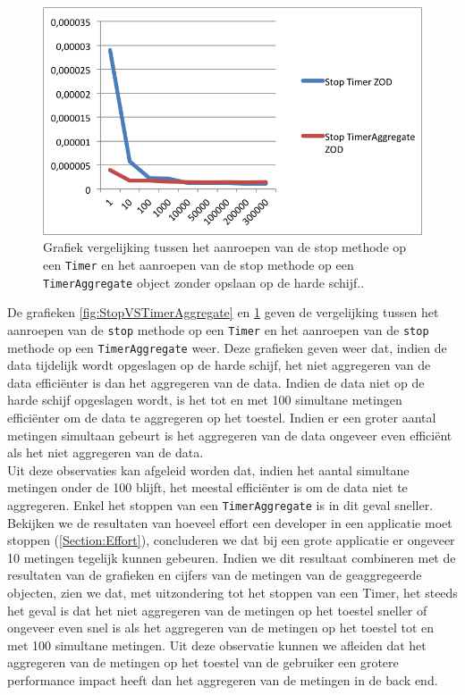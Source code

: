 \begin{figure}[h]
  \centering
  \includegraphics[scale=1.0]{Afbeeldingen/Evaluatie/StopVSTimerAggregateZOD}
  \caption{Grafiek vergelijking tussen het aanroepen van de stop methode op een \texttt{Timer} en het aanroepen van de stop methode op een \texttt{TimerAggregate} object zonder opslaan op de harde schijf..}
  \label{fig:StopVSTimerAggregateZOD}
\end{figure}
De grafieken \ref{fig:StopVSTimerAggregate} en \ref{fig:StopVSTimerAggregateZOD} geven de vergelijking tussen het aanroepen van de \texttt{stop} methode op een \texttt{Timer} en het aanroepen van de \texttt{stop} methode op een \texttt{TimerAggregate} weer. Deze grafieken geven weer dat, indien de data tijdelijk wordt opgeslagen op de harde schijf, het niet aggregeren van de data effici\"enter is dan het aggregeren van de data. Indien de data niet op de harde schijf opgeslagen wordt, is het tot en met 100 simultane metingen effici\"enter om de data te aggregeren op het toestel. Indien er een groter aantal metingen simultaan gebeurt is het aggregeren van de data ongeveer even effici\"ent als het niet aggregeren van de data. \\

Uit deze observaties kan afgeleid worden dat, indien het aantal simultane metingen onder de 100 blijft, het meestal effici\"enter is om de data niet te aggregeren. Enkel het stoppen van een \texttt{TimerAggregate} is in dit geval sneller. \\


Bekijken we de resultaten van hoeveel effort een developer in een applicatie moet stoppen (\ref{Section:Effort}), concluderen we dat bij een grote applicatie er ongeveer 10 metingen tegelijk kunnen gebeuren. Indien we dit resultaat combineren met de resultaten van de grafieken en cijfers van de metingen van de geaggregeerde objecten, zien we dat, met uitzondering tot het stoppen van een Timer, het steeds het geval is dat het niet aggregeren van de metingen op het toestel sneller of ongeveer even snel is als het aggregeren van de metingen op het toestel tot en met 100 simultane metingen. Uit deze observatie kunnen we afleiden dat het aggregeren van de metingen op het toestel van de gebruiker een grotere performance impact heeft dan het aggregeren van de metingen in de back end. \\

